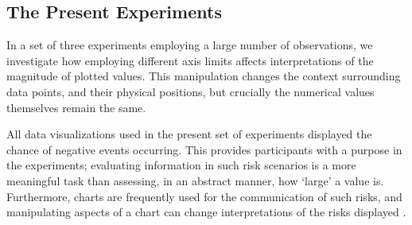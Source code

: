 \documentclass[journal]{vgtc}                %
\begin{document}
\hypertarget{the-present-experiments}{%
\subsection{The Present Experiments}\label{the-present-experiments}}

In a set of three experiments employing a large number of observations,
we investigate how employing different axis limits affects
interpretations of the magnitude of plotted values. This manipulation
changes the context surrounding data points, and their physical
positions, but crucially the numerical values themselves remain the
same.

All data visualizations used in the present set of experiments displayed
the chance of negative events occurring. This provides participants with
a purpose in the experiments; evaluating information in such risk
scenarios is a more meaningful task than assessing, in an abstract
manner, how `large' a value is. Furthermore, charts are frequently used
for the communication of such risks, and manipulating aspects of a chart
can change interpretations of the risks displayed
\citep{elting_influence_1999, feldman-stewart_perception_2000, keller_effect_2009, okan_probability_2020, zikmund-fisher_whats_2005}.
\end{document}
